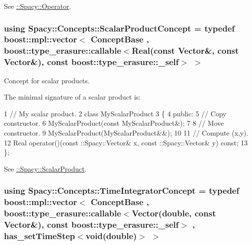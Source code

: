 See \hyperlink{group__SpacyGroup_ga3f89622eba80cf840b2a7102f1303455_OperatorAnchor}{\+:\+:Spacy\+:\+:Operator}. \hypertarget{group__ConceptGroup_ga1308724cda3078f228fb05c29556805d_ga1308724cda3078f228fb05c29556805d}{}
\subsubsection[{Scalar\+Product\+Concept}]{\setlength{\rightskip}{0pt plus 5cm}using {\bf Spacy\+::\+Concepts\+::\+Scalar\+Product\+Concept} = typedef boost\+::mpl\+::vector$<$ {\bf Concept\+Base} , boost\+::type\+\_\+erasure\+::callable$<${\bf Real}(const {\bf Vector}\&, const {\bf Vector}\&), const boost\+::type\+\_\+erasure\+::\+\_\+self$>$ $>$}\label{group__ConceptGroup_ga1308724cda3078f228fb05c29556805d_ga1308724cda3078f228fb05c29556805d}


Concept for scalar products. 

\label{group__ConceptGroup_ga1308724cda3078f228fb05c29556805d_ScalarProductConceptAnchor}%
\hypertarget{group__ConceptGroup_ga1308724cda3078f228fb05c29556805d_ScalarProductConceptAnchor}{}%
The minimal signature of a scalar product is\+: 
\begin{DoxyCode}
1 // My scalar product.
2 class MyScalarProduct
3 \{
4 public:
5   // Copy constructor.
6   MyScalarProduct(const MyScalarProduct&);
7 
8   // Move constructor.
9   MyScalarProduct(MyScalarProduct&&);
10 
11   // Compute (x,y).
12   Real operator()(const ::Spacy::Vector& x, const ::Spacy::Vector& y) const;
13 \};
\end{DoxyCode}


See \hyperlink{group__SpacyGroup_ga9fe0b4de20da1ab1ca3d04a0f96343e1_ScalarProductAnchor}{\+:\+:Spacy\+:\+:Scalar\+Product}. \hypertarget{group__ConceptGroup_ga45ecfe57ffb996aa97c9ff89a647f095_ga45ecfe57ffb996aa97c9ff89a647f095}{}
\subsubsection[{Time\+Integrator\+Concept}]{\setlength{\rightskip}{0pt plus 5cm}using {\bf Spacy\+::\+Concepts\+::\+Time\+Integrator\+Concept} = typedef boost\+::mpl\+::vector$<$ {\bf Concept\+Base} , boost\+::type\+\_\+erasure\+::callable$<${\bf Vector}(double, const {\bf Vector}\&), const boost\+::type\+\_\+erasure\+::\+\_\+self$>$ , has\+\_\+set\+Time\+Step$<$void(double)$>$ $>$}\label{group__ConceptGroup_ga45ecfe57ffb996aa97c9ff89a647f095_ga45ecfe57ffb996aa97c9ff89a647f095}


